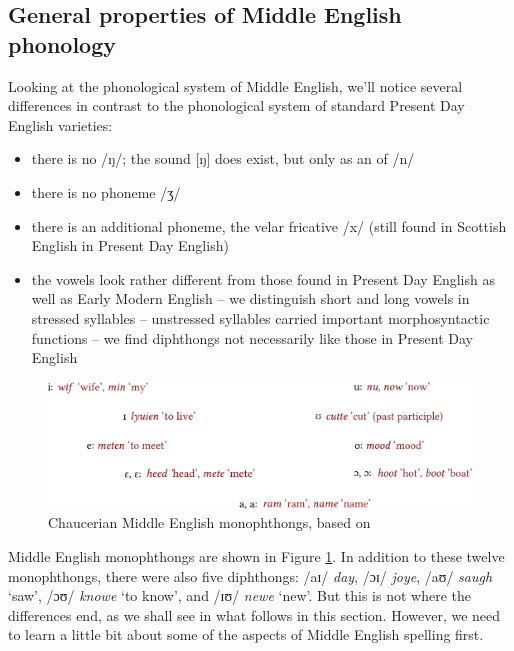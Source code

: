 \subsection{General properties of Middle English phonology}
Looking at the phonological system of Middle English, we'll notice several differences in contrast to the phonological system of standard Present Day English varieties:
\begin{itemize}
    \item there is no  /ŋ/; the sound [ŋ] does exist, but only as an  of /n/
    \item there is no phoneme /ʒ/
    \item there is an additional phoneme, the velar fricative /x/ (still found in Scottish English in Present Day English)
    \item the vowels look rather different from those found in Present Day English as well as Early Modern English
    \subitem -- we distinguish short and long vowels in stressed syllables
    \subitem -- unstressed syllables carried important morphosyntactic functions
    \subitem -- we find diphthongs not necessarily like those in Present Day English
\end{itemize}

\begin{figure}[t]
  \includegraphics[width=\textwidth]{chapters/img/MEmonophthongs.pdf}
  \caption{Chaucerian Middle English monophthongs, based on \citet[48]{HorobinSmith2002}}
  \label{fig:MEmonophthongs}
\end{figure}

Middle English monophthongs are shown in Figure \ref{fig:MEmonophthongs}. In addition to these twelve monophthongs, there were also five diphthongs: /aɪ/ \textit{day}, /ɔɪ/ \textit{joye}, /aʊ/ \textit{saugh} `saw', /ɔʊ/ \textit{knowe} `to know', and /ɪʊ/ \textit{newe} `new'. But this is not where the differences end, as we shall see in what follows in this section. However, we need to learn a little bit about some of the aspects of Middle English spelling first.

